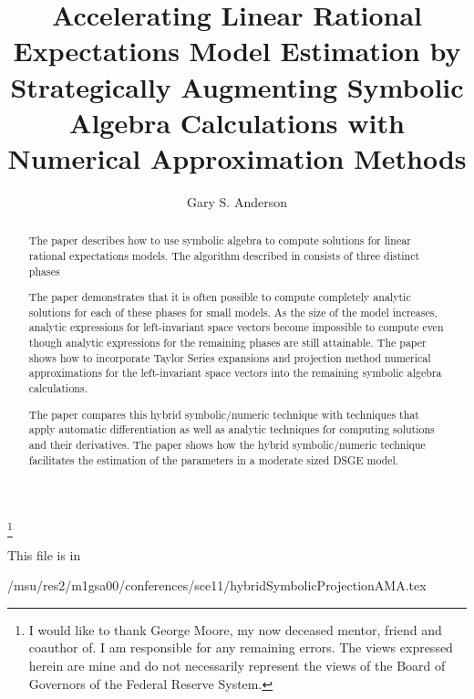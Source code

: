 \documentclass[12pt]{elsart}
\begin{document}
\begin{frontmatter}

\title{ Accelerating Linear Rational Expectations Model Estimation by
Strategically Augmenting Symbolic Algebra Calculations with Numerical Approximation Methods}

\author{Gary S. Anderson}
\thanks{I would like to thank George Moore, my now deceased mentor,
friend and coauthor of\cite{ANDER:AIM2}.
I am responsible for
any remaining errors.
The views expressed herein are mine and 
do not necessarily represent the views of the Board of Governors of the Federal
Reserve System.
}
\begin{abstract}
\noindent
The paper describes how to use symbolic algebra to compute 
solutions for linear rational expectations models.
The algorithm described in\cite{anderson10} consists of three distinct phases%

The paper demonstrates that it is often possible to 
compute completely analytic solutions for each of these phases for small models.
As the size of the model increases, analytic expressions for 
left-invariant space vectors become impossible to compute
even though analytic expressions for the
remaining phases are still attainable.
The paper shows how to incorporate Taylor Series expansions and  projection method
numerical approximations for the left-invariant space vectors
 into the remaining symbolic algebra calculations.

The paper compares this hybrid symbolic/numeric technique with techniques that
apply automatic differentiation\cite{bastani08}  as well as 
 analytic techniques for computing solutions 
and their derivatives\cite{ANDER:AIM3,zadrozny88,blake04}.
The paper shows how the hybrid symbolic/numeric technique facilitates
the estimation of the parameters in a moderate sized DSGE model.

\end{abstract}

This file is in

/msu/res2/m1gsa00/conferences/sce11/hybridSymbolicProjectionAMA.tex

\end{frontmatter}
\end{document}
